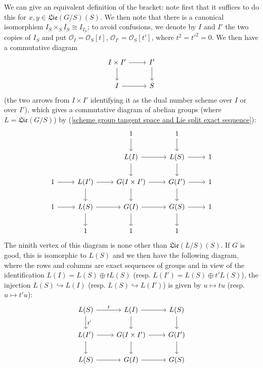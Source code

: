 \begin{remark}\label{scheme group Lie bracket definition by diagram}
We can give an equivalent definition of the bracket: note first that it suffices to do this for $x,y\in\mathfrak{Lie}(G/S)(S)$. We then note that there is a canonical isomorphism $I_S\times_SI_S\cong I_{I_S}$; to avoid confusions, we denote by $I$ and $I'$ the two copies of $I_S$ and put $\mathscr{O}_I=\mathscr{O}_S[t]$, $\mathscr{O}_{I'}=\mathscr{O}_S[t']$, where $t^2=t'^2=0$. We then have a commutative diagram
\[\begin{tikzcd}
I\times I'\ar[d]\ar[r]&I'\ar[d]\\
I\ar[r]&S
\end{tikzcd}\]
(the two arrows from $I\times I'$ identifying it as the dual number scheme over $I$ or over $I'$), which gives a commutative diagram of abelian groups (where $L=\mathfrak{Lie}(G/S)$) by (\ref{scheme group tangent space and Lie split exact sequence}):
\begin{equation}
\begin{tikzcd}
&&1\ar[d]&1\ar[d]&\\
&&L(I)\ar[d]\ar[r]&L(S)\ar[d]\ar[r]&1\\
1\ar[r]&L(I')\ar[r]\ar[d]&G(I\times I')\ar[r]\ar[d]&G(I')\ar[r]\ar[d]&1\\
1\ar[r]&L(S)\ar[r]\ar[d]&G(I)\ar[r]\ar[d]&G(S)\ar[r]\ar[d]&1\\
&1&1&1
\end{tikzcd}
\end{equation}
The ninith vertex of this diagram is none other than $\mathfrak{Lie}(L/S)(S)$. If $G$ is good, this is isomorphic to $L(S)$ and we then have the following diagram, where the rows and columns are exact sequences of groups and in view of the identification $L(I)=L(S)\oplus tL(S)$ (resp. $L(I')=L(S)\oplus t'L(S)$), the injection $L(S)\hookrightarrow L(I)$ (resp. $L(S)\hookrightarrow L(I')$) is given by $u\mapsto tu$ (resp. $u\mapsto t'u$):
\begin{equation}
\begin{tikzcd}
L(S)\ar[r,"t"]\ar[d,"t'"]&L(I)\ar[r]\ar[d]&L(S)\ar[d]\\
L(I')\ar[r]\ar[d]&G(I\times I')\ar[r]\ar[d]&G(I')\ar[d]\\
L(S)\ar[r]&G(I)\ar[r]&G(S)
\end{tikzcd}
\end{equation}


\end{remark}
